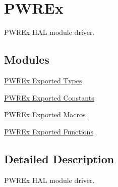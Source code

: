 \hypertarget{group___p_w_r_ex}{}\section{P\+W\+R\+Ex}
\label{group___p_w_r_ex}


P\+W\+R\+Ex H\+AL module driver.  


\subsection*{Modules}
\begin{DoxyCompactItemize}
\item 
\hyperlink{group___p_w_r_ex___exported___types}{P\+W\+R\+Ex Exported Types}
\item 
\hyperlink{group___p_w_r_ex___exported___constants}{P\+W\+R\+Ex Exported Constants}
\item 
\hyperlink{group___p_w_r_ex___exported___macros}{P\+W\+R\+Ex Exported Macros}
\item 
\hyperlink{group___p_w_r_ex___exported___functions}{P\+W\+R\+Ex Exported Functions}
\end{DoxyCompactItemize}


\subsection{Detailed Description}
P\+W\+R\+Ex H\+AL module driver. 

